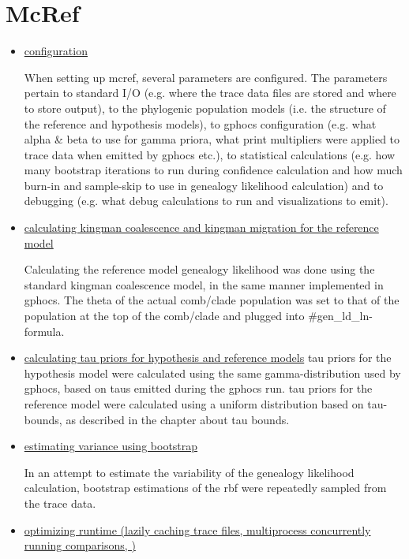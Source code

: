 \documentclass[11pt]{article}
\begin{document}
\section{McRef}

\begin{itemize}
\item \underline{configuration}

When setting up mcref, several parameters are configured. The parameters pertain to standard I/O (e.g. where the trace data files are stored and where to store output), to the phylogenic population models (i.e. the structure of the reference and hypothesis models), to gphocs configuration (e.g. what alpha \& beta to use for gamma priora, what print multipliers were applied to trace data when emitted by gphocs etc.), to statistical calculations (e.g. how many bootstrap iterations to run during confidence calculation and how much burn-in and sample-skip to use in genealogy likelihood calculation) and to debugging (e.g. what debug calculations to run and visualizations to emit). 

\item \underline{calculating kingman coalescence and kingman migration for the reference model}

Calculating the reference model genealogy likelihood was done using the standard kingman coalescence model, in the same manner implemented in gphocs. The theta of the actual comb/clade population was set to that of the population at the top of the comb/clade and plugged into \#gen\_ld\_ln-formula. 

\item \underline{calculating tau priors for hypothesis and reference models}
tau priors for the hypothesis model were calculated using the same gamma-distribution used by gphocs, based on taus emitted during the gphocs run. tau priors for the reference model were calculated using a uniform distribution based on tau-bounds, as described in the chapter about tau bounds.

\item \underline{estimating variance using bootstrap}

In an attempt to estimate the variability of the genealogy likelihood calculation, bootstrap estimations of the rbf were repeatedly sampled from the trace data. 


\item \underline{optimizing runtime (lazily caching trace files, multiprocess concurrently running comparisons, )}


\end{itemize}
\end{document}
